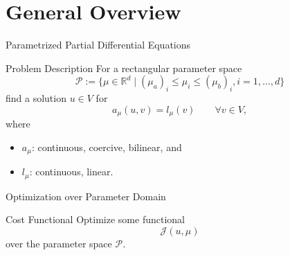 \section{General Overview}

\begin{frame}{Parametrized Partial Differential Equations}

    \begin{block}{Problem Description}
        For a rectangular parameter space
        \begin{equation*}
            \mathcal{P} := \{ \mu \in \mathbb{R}^d \; | \; {(\mu_a)}_i \leq \mu_i \leq {(\mu_b)}_i, i = 1, \dots, d \}
        \end{equation*}
        find a solution $u \in V$ for
        \begin{equation*}
            a_\mu(u, v) = l_\mu(v) \qquad \forall v \in V,
        \end{equation*}
        where
        \begin{itemize}
            \item $a_\mu$: continuous, coercive, bilinear, and
            \item $l_\mu$: continuous, linear.
        \end{itemize}
    \end{block}
\end{frame}

\begin{frame}{Optimization over Parameter Domain}
    \begin{block}{Cost Functional}
        Optimize some functional
        \begin{equation*}
            \mathcal{J}(u, \mu)
        \end{equation*}
        over the parameter space $\mathcal{P}$.
    \end{block}

\end{frame}

